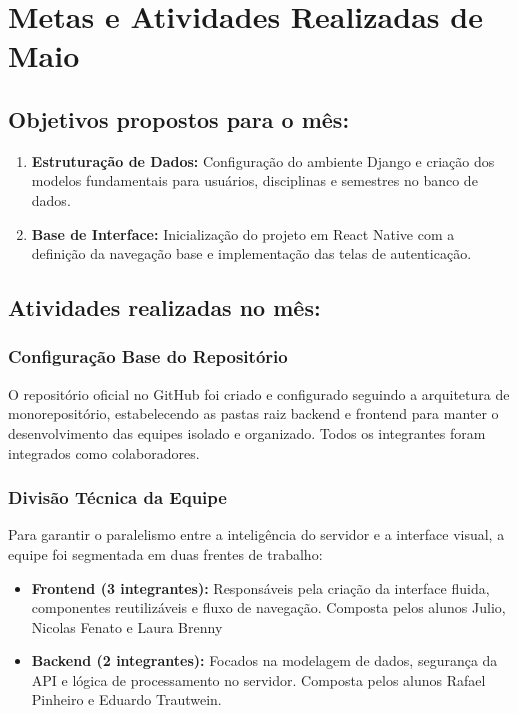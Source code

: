 \documentclass[12pt]{article}
\begin{document}
\section{Metas e Atividades Realizadas de Maio}

\subsection{Objetivos propostos para o mês:}
\begin{enumerate}
    \item \textbf{Estruturação de Dados:} Configuração do ambiente Django e criação dos modelos fundamentais para usuários, disciplinas e semestres no banco de dados.
    \item \textbf{Base de Interface:} Inicialização do projeto em React Native com a definição da navegação base e implementação das telas de autenticação.
\end{enumerate}

\subsection{Atividades realizadas no mês:}

\subsubsection{Configuração Base do Repositório}
O repositório oficial no GitHub foi criado e configurado seguindo a arquitetura de monorepositório, estabelecendo as pastas raiz backend e frontend para manter o desenvolvimento das equipes isolado e organizado. Todos os integrantes foram integrados como colaboradores.

\subsubsection{Divisão Técnica da Equipe}
Para garantir o paralelismo entre a inteligência do servidor e a interface visual, a equipe foi segmentada em duas frentes de trabalho:
\begin{itemize}
    \item \textbf{Frontend (3 integrantes):} Responsáveis pela criação da interface fluida, componentes reutilizáveis e fluxo de navegação. Composta pelos alunos Julio, Nicolas Fenato e Laura Brenny
    \item \textbf{Backend (2 integrantes):} Focados na modelagem de dados, segurança da API e lógica de processamento no servidor. Composta pelos alunos Rafael Pinheiro e Eduardo Trautwein.
\end{itemize}
\end{document}
